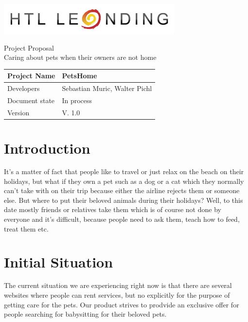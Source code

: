 \documentclass[12pt]{article}
\theoremstyle{definition}
\newenvironment{explanation}{%
   \setlength{\parindent}{0pt}
   \itshape
   \color{blue}
}{}
\newcommand{\projectname}{PetsHome}
\newcommand{\productname}{Caring about pets when their owners are not home}
\newcommand{\developers}{Sebastian Muric, Walter Pichl}
\newcommand{\documentstatus}{In process}
\newcommand{\version}{V. 1.0}
\begin{document}
\begin{titlepage}
\begin{flushright}
\includegraphics[scale=.5]{htlleondinglogo.png}\\
\end{flushright}

\vspace{10em}

\begin{center}
{\Huge Project Proposal} \\[3em]
{\LARGE \productname} \\[3em]
\end{center}

\begin{flushleft}
\begin{tabular}{|l|l|}
\hline
Project Name & \projectname \\ \hline
Developers & \developers \\ \hline
Document state & \documentstatus \\ \hline
Version & \version \\ \hline
\end{tabular}
\end{flushleft}

\end{titlepage}
\pagebreak

\tableofcontents
\pagebreak

\section{Introduction}
\begin{explanation}
It's a matter of fact that people like to travel or just relax on the beach on their holidays, but what if they own a pet such as a dog or a cat which they normally can't take with on their trip because either the airline rejects them or someone else.
But where to put their beloved animals during their holidays? Well, to this date mostly friends or relatives take them which is of course not done by everyone and it's difficult, because people need to ask them, teach how to feed, treat them etc.
\end{explanation}
\pagebreak

\section{Initial Situation}
\begin{explanation}
The current situation we are experiencing right now is that there are several websites where people can rent services, but no explicitly for the purpose of getting care for the pets.
Our product strives to prodvide an exclusive offer for people searching for babysitting for their beloved pets.
\end{explanation}
\pagebreak
\end{document}
